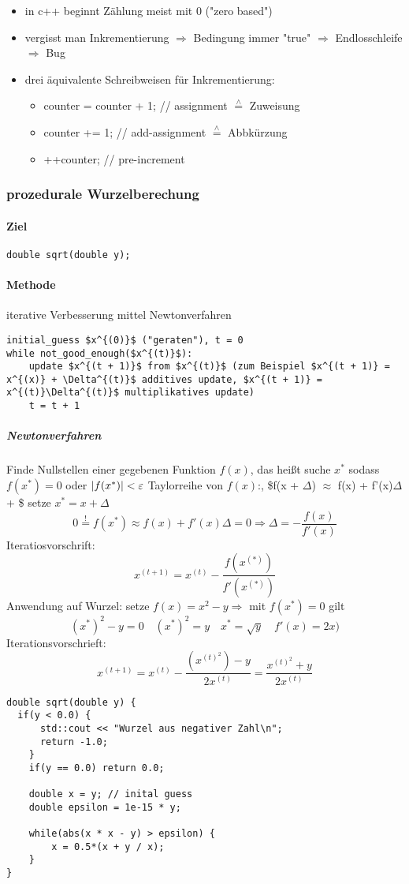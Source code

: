 \documentclass[a4paper]{scrartcl}
\newcommand{\estimates}{\overset{\scriptscriptstyle\wedge}{=}}%
\DeclarePairedDelimiter\abs{\lvert}{\rvert}%
\begin{document}
\begin{itemize}
\item in c++ beginnt Zählung meist mit $0$ ("zero based")
\item vergisst man Inkrementierung $\Rightarrow$ Bedingung immer "true" $\Rightarrow$ Endlosschleife $\Rightarrow$ Bug
\item drei äquivalente Schreibweisen für Inkrementierung:
\begin{itemize}
\item counter = counter + 1; // assignment $\estimates$ Zuweisung
\item counter += 1;          // add-assignment $\estimates$ Abbkürzung
\item ++counter;             // pre-increment
\end{itemize}
\end{itemize}
\subsubsection{prozedurale Wurzelberechung}
\label{sec-8-2-5}
\paragraph{Ziel}
\label{sec-8-2-5-1}
\begin{verbatim}
double sqrt(double y);
\end{verbatim}
\paragraph{Methode}
\label{sec-8-2-5-2}
iterative Verbesserung mittel Newtonverfahren
\begin{verbatim}
initial_guess $x^{(0)}$ ("geraten"), t = 0
while not_good_enough($x^{(t)}$):
	update $x^{(t + 1)}$ from $x^{(t)}$ (zum Beispiel $x^{(t + 1)} = x^{(x)} + \Delta^{(t)}$ additives update, $x^{(t + 1)} = x^{(t)}\Delta^{(t)}$ multiplikatives update)
	t = t + 1
\end{verbatim}
\subparagraph{Newtonverfahren}
\label{sec-8-2-5-2-1}
Finde Nullstellen einer gegebenen Funktion $f(x)$, das heißt suche $x^\ast$ sodass $f(x^\ast) = 0$ oder $\abs{f(x^\ast)} < \varepsilon$
Taylorreihe von $f(x)$:, \$f(x + $\Delta$) $\approx$ f(x) + f'(x)$\Delta$ + \$ setze $x^\ast = x + \Delta$
\[0 \overset{!}{=} f(x^\ast) \approx f(x) + f'(x)\Delta = 0 \Rightarrow \Delta = - \frac{f(x)}{f'(x)}\]
Iteratiosvorschrift:
\[x^{(t + 1)} = x^{(t)} - \frac{f(x^{(\ast)})}{f'(x^{(\ast)})}\]
Anwendung auf Wurzel: setze $f(x) = x^2 - y \Rightarrow$ mit $f(x^\ast) = 0$ gilt
\[(x^\ast)^2 -y = 0 \quad (x^\ast)^2 = y \quad x^\ast = \sqrt{y}\quad f'(x) = 2x)\]
Iterationsvorschrieft:
\[x^{(t + 1)} = x^{(t)} - \frac{(x^{(t)^2}) - y}{2x^{(t)}} = \frac{x^{(t)^2} + y}{2x^{(t)}}\]
\begin{verbatim}
double sqrt(double y) {
  if(y < 0.0) {
	  std::cout << "Wurzel aus negativer Zahl\n";
	  return -1.0;
	}
	if(y == 0.0) return 0.0;

	double x = y; // inital guess
	double epsilon = 1e-15 * y;

	while(abs(x * x - y) > epsilon) {
		x = 0.5*(x + y / x);
	}
}
\end{verbatim}
\end{document}
